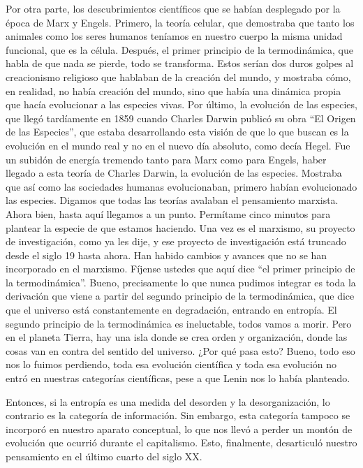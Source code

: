 \documentclass[
  jou,
  floatsintext,
  longtable,
  a4paper,
  nolmodern,
  notxfonts,
  notimes,
  colorlinks=true,linkcolor=blue,citecolor=blue,urlcolor=blue]{apa7}
\begin{document}
Por otra parte, los descubrimientos científicos que se habían desplegado
por la época de Marx y Engels. Primero, la teoría celular, que
demostraba que tanto los animales como los seres humanos teníamos en
nuestro cuerpo la misma unidad funcional, que es la célula. Después, el
primer principio de la termodinámica, que habla de que nada se pierde,
todo se transforma. Estos serían dos duros golpes al creacionismo
religioso que hablaban de la creación del mundo, y mostraba cómo, en
realidad, no había creación del mundo, sino que había una dinámica
propia que hacía evolucionar a las especies vivas. Por último, la
evolución de las especies, que llegó tardíamente en 1859 cuando Charles
Darwin publicó su obra ``El Origen de las Especies'', que estaba
desarrollando esta visión de que lo que buscan es la evolución en el
mundo real y no en el nuevo día absoluto, como decía Hegel. Fue un
subidón de energía tremendo tanto para Marx como para Engels, haber
llegado a esta teoría de Charles Darwin, la evolución de las especies.
Mostraba que así como las sociedades humanas evolucionaban, primero
habían evolucionado las especies. Digamos que todas las teorías avalaban
el pensamiento marxista. Ahora bien, hasta aquí llegamos a un punto.
Permítame cinco minutos para plantear la especie de que estamos
haciendo. Una vez es el marxismo, su proyecto de investigación, como ya
les dije, y ese proyecto de investigación está truncado desde el siglo
19 hasta ahora. Han habido cambios y avances que no se han incorporado
en el marxismo. Fíjense ustedes que aquí dice ``el primer principio de
la termodinámica''. Bueno, precisamente lo que nunca pudimos integrar es
toda la derivación que viene a partir del segundo principio de la
termodinámica, que dice que el universo está constantemente en
degradación, entrando en entropía. El segundo principio de la
termodinámica es ineluctable, todos vamos a morir. Pero en el planeta
Tierra, hay una isla donde se crea orden y organización, donde las cosas
van en contra del sentido del universo. ¿Por qué pasa esto? Bueno, todo
eso nos lo fuimos perdiendo, toda esa evolución científica y toda esa
evolución no entró en nuestras categorías científicas, pese a que Lenin
nos lo había planteado.

Entonces, si la entropía es una medida del desorden y la
desorganización, lo contrario es la categoría de información. Sin
embargo, esta categoría tampoco se incorporó en nuestro aparato
conceptual, lo que nos llevó a perder un montón de evolución que ocurrió
durante el capitalismo. Esto, finalmente, desarticuló nuestro
pensamiento en el último cuarto del siglo XX.
\end{document}
